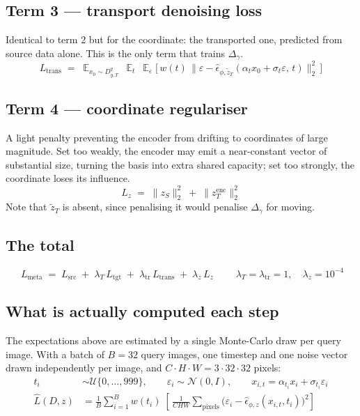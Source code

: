 \documentclass[11pt]{article}
\newcommand{\epshat}{\hat{\epsilon}}
\newcommand{\zS}{z_{S}}
\newcommand{\zencT}{z^{\mathrm{enc}}_{T}}
\newcommand{\ztilT}{\tilde{z}_{T}}
\newcommand{\Dqt}{D^{q}_{y,T}}
\begin{document}
\subsection{Term 3 --- transport denoising loss}

Identical to term 2 but for the coordinate: the transported one, predicted from source data alone.
This is the only term that trains $\Delta_\gamma$.
\begin{equation}
L_{\mathrm{trans}} \;=\;
\mathop{\mathbb{E}}_{x_0\sim \Dqt}\ \mathop{\mathbb{E}}_{t}\ \mathop{\mathbb{E}}_{\varepsilon}
\Big[\, w(t)\, \big\| \varepsilon - \epshat_{\phi,\ztilT}(\alpha_t x_0+\sigma_t\varepsilon,\, t) \big\|_2^2 \,\Big]
\end{equation}

\subsection{Term 4 --- coordinate regulariser}

A light penalty preventing the encoder from drifting to coordinates of large magnitude. Set too
weakly, the encoder may emit a near-constant vector of substantial size, turning the basis into
extra shared capacity; set too strongly, the coordinate loses its influence.
\begin{equation}
L_{z} \;=\; \|\zS\|_2^2 \;+\; \|\zencT\|_2^2
\end{equation}
Note that $\ztilT$ is absent, since penalising it would penalise $\Delta_\gamma$ for moving.

\subsection{The total}

\begin{equation}
\boxed{\;
L_{\mathrm{meta}} \;=\; L_{\mathrm{src}}
  \;+\; \lambda_{T}\,L_{\mathrm{tgt}}
  \;+\; \lambda_{\mathrm{tr}}\,L_{\mathrm{trans}}
  \;+\; \lambda_{z}\,L_{z} \;}
\qquad \lambda_{T}=\lambda_{\mathrm{tr}}=1,\quad \lambda_{z}=10^{-4}
\end{equation}

\subsection{What is actually computed each step}

The expectations above are estimated by a single Monte-Carlo draw per query image. With a batch of
$B=32$ query images, one timestep and one noise vector drawn independently per image, and
$C\!\cdot\!H\!\cdot\!W = 3\cdot32\cdot32$ pixels:
\begin{align}
t_i &\sim \mathcal{U}\{0,\dots,999\}, \qquad
\varepsilon_i \sim \mathcal{N}(0,I), \qquad
x_{i,t} = \alpha_{t_i} x_i + \sigma_{t_i}\varepsilon_i \\[4pt]
\widehat{L}(D,z) &= \frac{1}{B}\sum_{i=1}^{B} w(t_i)\;
  \left[\, \frac{1}{C H W}\sum_{\text{pixels}}
  \big( \varepsilon_i - \epshat_{\phi,z}(x_{i,t},t_i) \big)^2 \right]
\end{align}
\end{document}
